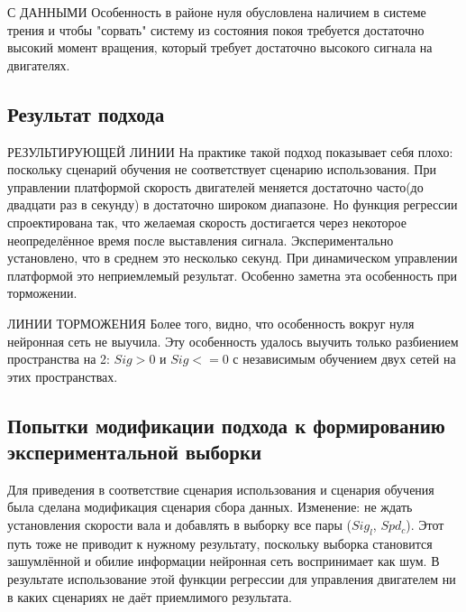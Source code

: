 \documentclass[14pt]{extreport}
\begin{document}
                { С ДАННЫМИ}
                Особенность в районе нуля обусловлена наличием в системе трения и чтобы "сорвать" систему из состояния покоя требуется достаточно высокий момент вращения, который требует достаточно высокого сигнала на двигателях.
            \subsection{Результат подхода}

                { РЕЗУЛЬТИРУЮЩЕЙ ЛИНИИ}
                На практике такой подход показывает себя плохо: поскольку сценарий обучения не соответствует сценарию использования. При управлении платформой скорость двигателей меняется достаточно часто(до двадцати раз в секунду) в достаточно широком диапазоне. Но функция регрессии спроектирована так, что желаемая скорость достигается через некоторое неопределённое время после выставления сигнала. Экспериментально установлено, что в среднем это несколько секунд. При динамическом управлении платформой это неприемлемый результат. Особенно заметна эта особенность при торможении.

                { ЛИНИИ ТОРМОЖЕНИЯ}
                Более того, видно, что особенность вокруг нуля нейронная сеть не выучила. Эту особенность удалось выучить только разбиением пространства на 2: $Sig>0$ и $Sig<=0$ с независимым обучением двух сетей на этих пространствах.
            \subsection{Попытки модификации подхода к формированию экспериментальной выборки}
                Для приведения в соответствие сценария использования и сценария обучения была сделана модификация сценария сбора данных. Изменение: не ждать установления скорости вала и добавлять в выборку все пары ($Sig_l$, $Spd_c$). Этот путь тоже не приводит к нужному результату, поскольку выборка становится зашумлённой и обилие информации нейронная сеть воспринимает как шум. В результате использование этой функции регрессии для управления двигателем ни в каких сценариях не даёт приемлимого результата.
\end{document}
